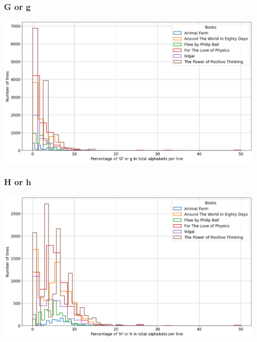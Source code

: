 \begin{frame}
    \frametitle{G or g}
    \begin{center}
        \hspace*{-5ex}
        \includegraphics[scale=0.35]{../01_programFiles/histograms/g.png}\hspace{10ex}
    \end{center}
\end{frame}

\begin{frame}
    \frametitle{H or h}
    \begin{center}
        \hspace*{-5ex}
        \includegraphics[scale=0.35]{../01_programFiles/histograms/h.png}\hspace{10ex}
    \end{center}
\end{frame}

